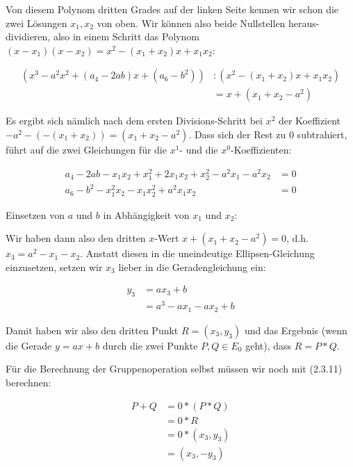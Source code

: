\begin{enumerate}[label=\alph*)]
Von diesem Polynom dritten Grades auf der linken Seite kennen wir schon die zwei Lösungen $x_{1}, x_{2}$ von oben. Wir können also
beide Nullstellen heraus-dividieren, also in einem Schritt das Polynom $(x-x_{1})(x-x_{2}) = x^{2} - (x_{1}+x_{2})x + x_{1}x_{2}$:

\begin{align*}
(x^{3} - a^{2}x^{2} + (a_{4} - 2ab)x + (a_{6} - b^{2})) &: (x^{2} - (x_{1}+x_{2})x + x_{1}x_{2}) \\
&= x + (x_{1} + x_{2} - a^{2})
\end{align*}

Es ergibt sich nämlich nach dem ersten Divisions-Schritt bei $x^{2}$ der Koeffizient $-a^{2} - (-(x_{1} + x_{2})) = (x_{1} + x_{2} - a^{2})$.
Dass sich der Rest zu $0$ subtrahiert, führt auf die zwei Gleichungen für die $x^{1}$- und die $x^{0}$-Koeffizienten:

\begin{align*}
a_{4} - 2ab - x_{1}x_{2} + x_{1}^{2} + 2x_{1}x_{2} + x_{2}^{2} - a^{2}x_{1} - a^{2}x_{2} &= 0 \\
a_{6} - b^{2} - x_{1}^{2}x_{2} - x_{1}x_{2}^{2} + a^{2}x_{1}x_{2} &= 0
\end{align*}

Einsetzen von $a$ und $b$ in Abhängigkeit von $x_{1}$ und $x_{2}$:

Wir haben dann also den dritten $x$-Wert $x + (x_{1} + x_{2} - a^{2}) = 0$, d.h. $x_{3} = a^{2} - x_{1} - x_{2}$.
Anstatt diesen in die uneindeutige Ellipsen-Gleichung einzusetzen, setzen wir $x_{3}$ lieber in die Geradengleichung ein:

\begin{align*}
y_{3} &= ax_{3} + b \\
&= a^{3} - ax_{1} - ax_{2} + b
\end{align*}

Damit haben wir also den dritten Punkt $R = (x_{3}, y_{3})$ und das Ergebnis (wenn die Gerade $y = ax + b$ durch die zwei Punkte $P, Q \in E_{0}$ geht),
dass $R = P \ast Q$.

Für die Berechnung der Gruppenoperation selbst müssen wir noch mit (2.3.11) berechnen:

\begin{align*}
P + Q &= 0 \ast (P \ast Q) \\
&= 0 \ast R \\
&= 0 \ast (x_{3}, y_{3}) \\
&= (x_{3}, -y_{3})
\end{align*}




\end{enumerate}
